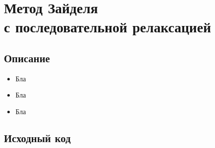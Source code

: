 \documentclass[../../report.tex]{subfiles}
\begin{document}
\chapter[Метод Зайделя с последовательной релаксацией]{\texorpdfstring{Метод Зайделя \\ 
с последовательной релаксацией}{Метод Зайделя с последовательной релаксацией}}

\section{Описание}
\begin{itemize}
    \item Бла
    \item Бла
    \item Бла
\end{itemize}

\section{Исходный код}
\end{document}

